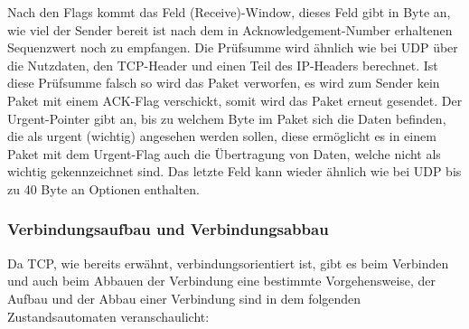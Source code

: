 \documentclass[a4paper,14pt,headsepline]{scrartcl}
\begin{document}
Nach den Flags kommt das Feld (Receive)-Window, dieses Feld gibt in Byte an, wie viel der Sender bereit ist nach dem in Acknowledgement-Number erhaltenen Sequenzwert noch zu empfangen. Die Prüfsumme wird ähnlich wie bei UDP über die Nutzdaten, den TCP-Header und einen Teil des IP-Headers berechnet. Ist diese Prüfsumme falsch so wird das Paket verworfen, es wird zum Sender kein Paket mit einem ACK-Flag verschickt, somit wird das Paket erneut gesendet. Der Urgent-Pointer gibt an, bis zu welchem Byte im Paket sich die Daten befinden, die als urgent (wichtig) angesehen werden sollen, diese ermöglicht es in einem Paket mit dem Urgent-Flag auch die Übertragung von Daten, welche nicht als wichtig gekennzeichnet sind. Das letzte Feld kann wieder ähnlich wie bei UDP bis zu 40 Byte an Optionen enthalten.

\subsubsection*{Verbindungsaufbau und Verbindungsabbau}
Da TCP, wie bereits erwähnt, verbindungsorientiert ist, gibt es beim Verbinden und auch beim Abbauen der Verbindung eine bestimmte Vorgehensweise, der Aufbau und der Abbau einer Verbindung sind in dem folgenden Zustandsautomaten veranschaulicht:

\begin{figure}[h]
\begin{center}
\end{center}
\end{figure}
\end{document}
